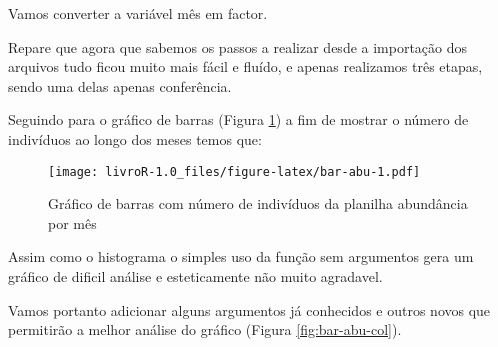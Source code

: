 \documentclass[]{book}
\newenvironment{Shaded}{\begin{snugshade}}{\end{snugshade}}
\newcommand{\DataTypeTok}[1]{\textcolor[rgb]{0.13,0.29,0.53}{#1}}
\newcommand{\DecValTok}[1]{\textcolor[rgb]{0.00,0.00,0.81}{#1}}
\newcommand{\KeywordTok}[1]{\textcolor[rgb]{0.13,0.29,0.53}{\textbf{#1}}}
\newcommand{\NormalTok}[1]{#1}
\newcommand{\OperatorTok}[1]{\textcolor[rgb]{0.81,0.36,0.00}{\textbf{#1}}}
\newcommand{\StringTok}[1]{\textcolor[rgb]{0.31,0.60,0.02}{#1}}
\begin{document}
Vamos converter a variável mês em factor.

\begin{Shaded}
\end{Shaded}

Repare que agora que sabemos os passos a realizar desde a importação dos arquivos tudo ficou muito mais fácil e fluído, e apenas realizamos três etapas, sendo uma delas apenas conferência.

Seguindo para o gráfico de barras (Figura \ref{fig:bar-abu}) a fim de mostrar o número de indivíduos ao longo dos meses temos que:

\begin{Shaded}
\end{Shaded}

\begin{figure}
\centering
\texttt{[image: livroR-1.0\_files/figure-latex/bar-abu-1.pdf]}
\caption{\label{fig:bar-abu}Gráfico de barras com número de indivíduos da planilha abundância por mês}
\end{figure}

Assim como o histograma o simples uso da função sem argumentos gera um gráfico de dificil análise e esteticamente não muito agradavel.

Vamos portanto adicionar alguns argumentos já conhecidos e outros novos que permitirão a melhor análise do gráfico (Figura \ref{fig:bar-abu-col}).

\begin{Shaded}
\end{Shaded}
\end{document}
